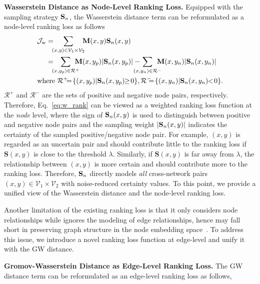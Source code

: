\noindent\textbf{Wasserstein Distance as Node-Level Ranking Loss.}
Equipped with the sampling strategy $\mathbf{S}_n$, the Wasserstein distance term can be reformulated as a node-level ranking loss as follows
\vspace{-2pt}
\begin{equation}\label{eq:w_rank}
    \begin{aligned}
        \mathcal{J}_{\text{w}}&=\!\!\!\sum_{(x,y)\in\mathcal{V}_1\times \mathcal{V}_2}\!\!\!\mathbf{M}(x,y)\sn(x,y)\\
        &=\!\!\!\sum_{(x,y_p)\in\mathcal{R}^+} \!\!\!\!\!\mathbf{M}(x, y_p)|\sn(x, y_p)|-\!\!\!\!\!\!\!\sum_{(x,y_n)\in\mathcal{R}^-}\!\!\!\!\!\mathbf{M}(x, y_n)|\sn(x, y_n)|\\
        \text{wh}&\text{ere } \mathcal{R}^+\!\!\!=\!\{(x, y_p) | \sn(x, y_p) \!\!\geq\! 0\},\mathcal{R}^-\!\!\!\!=\!\{(x, y_n) | \sn(x, y_n) \!\!<\! 0\}.
    \end{aligned}
\end{equation}
\vspace{-2pt}
$\mathcal{R}^+$ and $\mathcal{R}^-$ are the sets of positive and negative node pairs, respectively. Therefore, Eq.~\eqref{eq:w_rank} can be viewed as a weighted ranking loss function at the \textit{node} level, where the sign of $\mathbf{S}_n(x,y)$ is used to distinguish between positive and negative node pairs and the sampling weight $|\mathbf{S}_n(x,y)|$ indicates the certainty of the sampled positive/negative node pair. For example, $(x,y)$ is regarded as an uncertain pair and should contribute little to the ranking loss if $\mathbf{S}(x,y)$ is close to the threshold $\lambda$. Similarly, if $\mathbf{S}(x,y)$ is far away from $\lambda$, the relationship between $(x,y)$ is more certain and should contribute more to the ranking loss. Therefore, $\mathbf{S}_n$ directly models \textit{all} cross-network pairs $(x,y)\in\mathcal{V}_1\times\mathcal{V}_2$ with noise-reduced certainty values.
To this point, we provide a unified view of the Wasserstein distance and the node-level ranking loss.

Another limitation of the existing ranking loss is that it only considers node relationships while ignores the modeling of edge relationships, hence may fall short in preserving graph structure in the node embedding space~\cite{dlna,slotalign}. To address this issue, we introduce a novel ranking loss function at edge-level and unify it with the GW distance.

\noindent\textbf{Gromov-Wasserstein Distance as Edge-Level Ranking Loss.}
The GW distance term can be reformulated as an edge-level ranking loss as follows,

